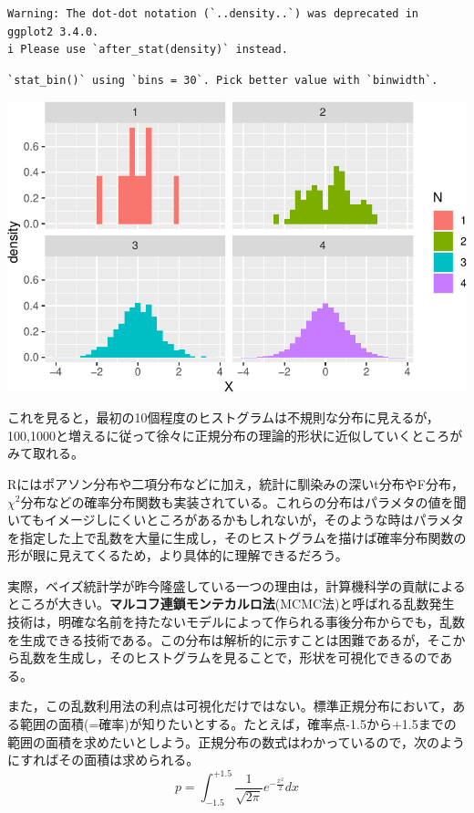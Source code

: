 \documentclass[
  a4paper,
]{ltjsbook}
\begin{document}
\begin{verbatim}
Warning: The dot-dot notation (`..density..`) was deprecated in ggplot2 3.4.0.
i Please use `after_stat(density)` instead.
\end{verbatim}

\begin{verbatim}
`stat_bin()` using `bins = 30`. Pick better value with `binwidth`.
\end{verbatim}

\includegraphics{chapter06_files/figure-pdf/rnorm-1.pdf}

これを見ると，最初の10個程度のヒストグラムは不規則な分布に見えるが，100,1000と増えるに従って徐々に正規分布の理論的形状に近似していくところがみて取れる。

Rにはポアソン分布や二項分布などに加え，統計に馴染みの深いt分布やF分布，\(\chi^2\)分布などの確率分布関数も実装されている。これらの分布はパラメタの値を聞いてもイメージしにくいところがあるかもしれないが，そのような時はパラメタを指定した上で乱数を大量に生成し，そのヒストグラムを描けば確率分布関数の形が眼に見えてくるため，より具体的に理解できるだろう。

実際，ベイズ統計学が昨今隆盛している一つの理由は，計算機科学の貢献によるところが大きい。\textbf{マルコフ連鎖モンテカルロ法}(MCMC法)と呼ばれる乱数発生技術は，明確な名前を持たないモデルによって作られる事後分布からでも，乱数を生成できる技術である。この分布は解析的に示すことは困難であるが，そこから乱数を生成し，そのヒストグラムを見ることで，形状を可視化できるのである。

また，この乱数利用法の利点は可視化だけではない。標準正規分布において，ある範囲の面積(=確率)が知りたいとする。たとえば，確率点-1.5から+1.5までの範囲の面積を求めたいとしよう。正規分布の数式はわかっているので，次のようにすればその面積は求められる。
\[ p = \int_{-1.5}^{+1.5} \frac{1}{\sqrt{2\pi}}e^{-\frac{x^2}{2}} dx \]
\end{document}
